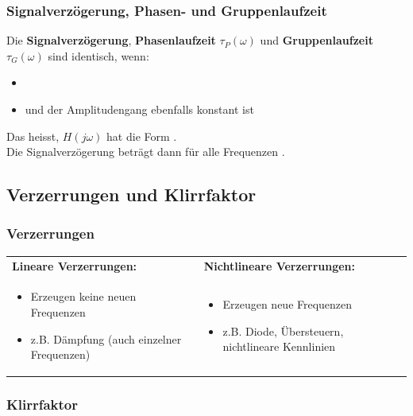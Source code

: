 		
		\subsubsection{Signalverzögerung, Phasen- und Gruppenlaufzeit }
		
			Die \textbf{Signalverzögerung}, \textbf{Phasenlaufzeit} $\tau_P(\omega)$
			und \textbf{Gruppenlaufzeit} $\tau_G(\omega)$ sind identisch, wenn:
			\begin{itemize}
				\item {}
				\item und der Amplitudengang ebenfalls konstant ist
			\end{itemize}
			
			Das heisst, $H(j \omega)$ hat die Form . \\
			Die Signalverzögerung beträgt dann für alle Frequenzen .
	
		
	\subsection{Verzerrungen und Klirrfaktor }
	
		\subsubsection{Verzerrungen }
		
			\begin{tabular}{ll}
				\textbf{Lineare Verzerrungen:}
			&	\textbf{Nichtlineare Verzerrungen:}
			\\
				\parbox{9cm}{
					\begin{itemize}
						\item Erzeugen keine neuen Frequenzen
						\item z.B. Dämpfung (auch einzelner Frequenzen)
					\end{itemize}}
			&	\parbox{9cm}{
					\begin{itemize}
						\item Erzeugen neue Frequenzen
						\item z.B. Diode, Übersteuern, nichtlineare Kennlinien
					\end{itemize}}
			\\
			\end{tabular}
			
			
		\subsubsection{Klirrfaktor }
	
